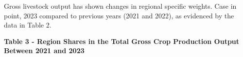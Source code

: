 
Gross livestock output has shown changes in regional specific weights.
Case in point, 2023 compared to previous years (2021 and 2022), as
evidenced by the data in Table 2.

{\bfseries Table 3 - Region Shares in the Total Gross Crop Production
Output Between 2021 and 2023}

